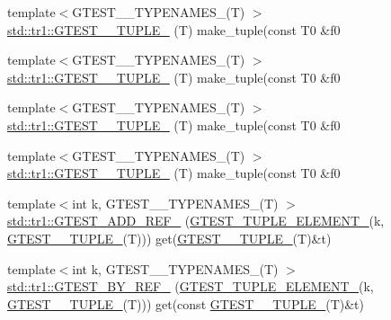 \begin{DoxyCompactItemize}
{\footnotesize template$<$G\+T\+E\+S\+T\+\_\+\_\+\+T\+Y\+P\+E\+N\+A\+M\+E\+S\+\_\+(\+T) $>$ }\\\hyperlink{namespacestd_1_1tr1_a61277f5af24b20fce87a9fd94307ab34}{std\+::tr1\+::\+G\+T\+E\+S\+T\+\_\+\_\+\+T\+U\+P\+L\+E\+\_\+} (T) make\+\_\+tuple(const T0 \&f0
\item 
{\footnotesize template$<$G\+T\+E\+S\+T\+\_\+\_\+\+T\+Y\+P\+E\+N\+A\+M\+E\+S\+\_\+(\+T) $>$ }\\\hyperlink{namespacestd_1_1tr1_a29c8efcb79a4749e079b704c418266e6}{std\+::tr1\+::\+G\+T\+E\+S\+T\+\_\+\_\+\+T\+U\+P\+L\+E\+\_\+} (T) make\+\_\+tuple(const T0 \&f0
\item 
{\footnotesize template$<$G\+T\+E\+S\+T\+\_\+\_\+\+T\+Y\+P\+E\+N\+A\+M\+E\+S\+\_\+(\+T) $>$ }\\\hyperlink{namespacestd_1_1tr1_a6afad1f98814ccc897d0b02bc6fc4e7d}{std\+::tr1\+::\+G\+T\+E\+S\+T\+\_\+\_\+\+T\+U\+P\+L\+E\+\_\+} (T) make\+\_\+tuple(const T0 \&f0
\item 
{\footnotesize template$<$G\+T\+E\+S\+T\+\_\+\_\+\+T\+Y\+P\+E\+N\+A\+M\+E\+S\+\_\+(\+T) $>$ }\\\hyperlink{namespacestd_1_1tr1_aa636d3269bf1f368a7bc09ff158bc482}{std\+::tr1\+::\+G\+T\+E\+S\+T\+\_\+\_\+\+T\+U\+P\+L\+E\+\_\+} (T) make\+\_\+tuple(const T0 \&f0
\item 
{\footnotesize template$<$int k, G\+T\+E\+S\+T\+\_\+\_\+\+T\+Y\+P\+E\+N\+A\+M\+E\+S\+\_\+(\+T) $>$ }\\\hyperlink{namespacestd_1_1tr1_ad0769041710d18b917067576f84b0303}{std\+::tr1\+::\+G\+T\+E\+S\+T\+\_\+\+A\+D\+D\+\_\+\+R\+E\+F\+\_\+} (\hyperlink{gtest-tuple_8h_a1b7f133d8aa02e0b7afed7b66781eeb7}{G\+T\+E\+S\+T\+\_\+\+T\+U\+P\+L\+E\+\_\+\+E\+L\+E\+M\+E\+N\+T\+\_\+}(k, \hyperlink{gtest-tuple_8h_a275e7bcd84299cc44b9c1dba971951c4}{G\+T\+E\+S\+T\+\_\+\_\+\+T\+U\+P\+L\+E\+\_\+}(T))) get(\hyperlink{gtest-tuple_8h_a275e7bcd84299cc44b9c1dba971951c4}{G\+T\+E\+S\+T\+\_\+\_\+\+T\+U\+P\+L\+E\+\_\+}(T)\&t)
\item 
{\footnotesize template$<$int k, G\+T\+E\+S\+T\+\_\+\_\+\+T\+Y\+P\+E\+N\+A\+M\+E\+S\+\_\+(\+T) $>$ }\\\hyperlink{namespacestd_1_1tr1_a7c131d0c2462612a78012be16114f61d}{std\+::tr1\+::\+G\+T\+E\+S\+T\+\_\+\+B\+Y\+\_\+\+R\+E\+F\+\_\+} (\hyperlink{gtest-tuple_8h_a1b7f133d8aa02e0b7afed7b66781eeb7}{G\+T\+E\+S\+T\+\_\+\+T\+U\+P\+L\+E\+\_\+\+E\+L\+E\+M\+E\+N\+T\+\_\+}(k, \hyperlink{gtest-tuple_8h_a275e7bcd84299cc44b9c1dba971951c4}{G\+T\+E\+S\+T\+\_\+\_\+\+T\+U\+P\+L\+E\+\_\+}(T))) get(const \hyperlink{gtest-tuple_8h_a275e7bcd84299cc44b9c1dba971951c4}{G\+T\+E\+S\+T\+\_\+\_\+\+T\+U\+P\+L\+E\+\_\+}(T)\&t)

\end{DoxyCompactItemize}
